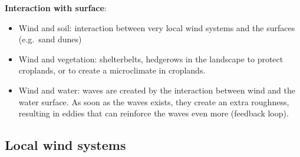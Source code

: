 \documentclass[oneside]{book}
\begin{document}
\textbf{Interaction with surface}:

\begin{itemize}
\item
  Wind and soil: interaction between very local wind systems and the
  surfaces (e.g.~sand dunes)
\item
  Wind and vegetation: shelterbelts, hedgerows in the landscape to
  protect croplands, or to create a microclimate in croplands.
\item
  Wind and water: waves are created by the interaction between wind and
  the water surface. As soon as the waves exists, they create an extra
  roughness, resulting in eddies that can reinforce the waves even more
  (feedback loop).
\end{itemize}

\subsection{Local wind systems}\label{local-wind-systems}
\end{document}
